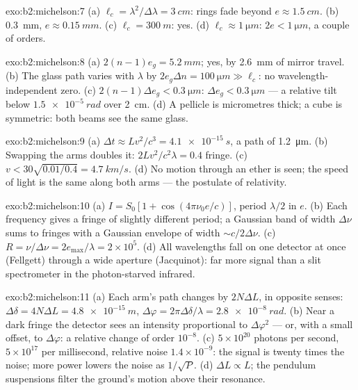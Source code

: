 \begin{solution}{exo:b2:michelson:7}
(a) $\ell_c = \lambda^2/\Delta\lambda = \qty{3}{cm}$: rings fade beyond $e \approx \qty{1.5}{cm}$. (b)
\qty{0.3}{mm}, $e \approx \qty{0.15}{mm}$. (c) $\ell_c = \qty{300}{m}$: yes. (d) $\ell_c \approx \qty{1}{\micro m}$:
$2e < \qty{1}{\micro m}$, a couple of orders.
\end{solution}

\begin{solution}{exo:b2:michelson:8}
(a) $2(n - 1)e_g = \qty{5.2}{mm}$; yes, by \qty{2.6}{mm} of mirror travel. (b) The
glass path varies with $\lambda$ by $2e_g\Delta n = \qty{100}{\micro m} \gg \ell_c$: no
wavelength-independent zero. (c) $2(n - 1)\Delta e_g < \qty{0.3}{\micro m}$: $\Delta e_g <
\qty{0.3}{\micro m}$ --- a relative tilt below $\qty{1.5e-5}{rad}$ over \qty{2}{cm}. (d) A
pellicle is micrometres thick; a cube is symmetric: both beams see
the same glass.
\end{solution}

\begin{solution}{exo:b2:michelson:9}
(a) $\Delta t \approx Lv^2/c^3 = \qty{4.1e-15}{s}$, a path of \qty{1.2}{\micro m}. (b) Swapping the
arms doubles it: $2Lv^2/c^2\lambda = 0.4$ fringe. (c) $v < 30\sqrt{0.01/0.4} =
\qty{4.7}{km/s}$. (d) No motion through an ether is seen; the speed of light
is the same along both arms --- the postulate of relativity.
\end{solution}

\begin{solution}{exo:b2:michelson:10}
(a) $I = S_0[1 + \cos(4\pi\nu_0e/c)]$, period $\lambda/2$ in $e$. (b) Each frequency
gives a fringe of slightly different period; a Gaussian band of width
$\Delta\nu$ sums to fringes with a Gaussian envelope of width $\sim c/2\Delta\nu$.
(c) $R = \nu/\Delta\nu = 2e_{\max}/\lambda = 2 \times 10^5$. (d) All wavelengths fall on
one detector at once (Fellgett) through a wide aperture (Jacquinot):
far more signal than a slit spectrometer in the photon-starved
infrared.
\end{solution}

\begin{solution}{exo:b2:michelson:11}
(a) Each arm's path changes by $2N\Delta L$, in opposite senses: $\Delta\delta = 4N\Delta L
= \qty{4.8e-15}{m}$, $\Delta\varphi = 2\pi\Delta\delta/\lambda = \qty{2.8e-8}{rad}$. (b) Near a dark
fringe the detector sees an intensity proportional to $\Delta\varphi^2$ --- or,
with a small offset, to $\Delta\varphi$: a relative change of order $10^{-8}$. (c)
$5 \times 10^{20}$ photons per second, $5 \times 10^{17}$ per millisecond, relative
noise $1.4 \times 10^{-9}$: the signal is twenty times the noise; more power
lowers the noise as $1/\sqrt P$. (d) $\Delta L \propto L$; the pendulum suspensions
filter the ground's motion above their resonance.
\end{solution}

